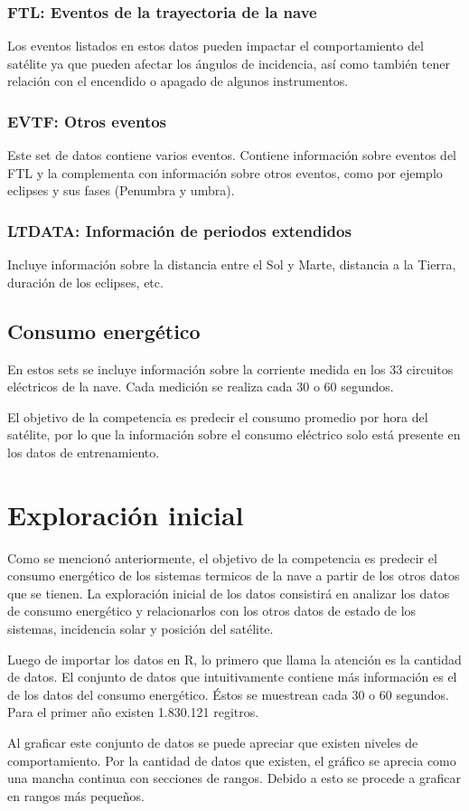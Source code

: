 \documentclass[../Main.tex]{subfiles}
\begin{document}
\subsubsection*{FTL: Eventos de la trayectoria de la nave}
Los eventos listados en estos datos pueden impactar el comportamiento del satélite ya que pueden afectar los ángulos de incidencia, así como también tener relación con el encendido o apagado de algunos instrumentos.
\subsubsection*{EVTF: Otros eventos}
Este set de datos contiene varios eventos. Contiene información sobre eventos del FTL y la complementa con información sobre otros eventos, como por ejemplo eclipses y sus fases (Penumbra y umbra).
\subsubsection*{LTDATA: Información de periodos extendidos}
Incluye información sobre la distancia entre el Sol y Marte, distancia a la Tierra, duración de los eclipses, etc.

\subsection*{Consumo energético}
En estos sets se incluye información sobre la corriente medida en los 33 circuitos eléctricos de la nave. Cada medición se realiza cada 30 o 60 segundos. 
\newline \par 
El objetivo de la competencia es predecir el consumo promedio por hora del satélite, por lo que la información sobre el consumo eléctrico solo está presente en los datos de entrenamiento.

\section{Exploración inicial}
Como se mencionó anteriormente, el objetivo de la competencia es predecir el consumo energético de los sistemas termicos de la nave a partir de los otros datos que se tienen. La exploración inicial de los datos consistirá en analizar los datos de consumo energético y relacionarlos con los otros datos de estado de los sistemas, incidencia solar y posición del satélite.
\newline \par 
Luego de importar los datos en R, lo primero que llama la atención es la cantidad de datos. El conjunto de datos que intuitivamente contiene más información es el de los datos del consumo energético. Éstos se muestrean cada 30 o 60 segundos. Para el primer año existen 1.830.121 regitros.
\newline \par 
Al graficar este conjunto de datos se puede apreciar que existen niveles de comportamiento. Por la cantidad de datos que existen, el gráfico se aprecia como una mancha continua con secciones de rangos. Debido a esto se procede a graficar en rangos más pequeños.
\end{document}
